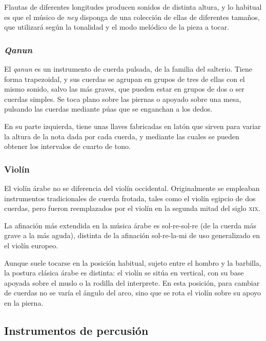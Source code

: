     Flautas de diferentes longitudes producen sonidos de distinta altura, y lo habitual es que el músico de \emph{ney} disponga de una colección de ellas de diferentes tamaños, que utilizará según la tonalidad  y el modo melódico de la pieza a tocar.


    \subsubsection{\emph{Qanun}}

    El \emph{qanun} es un instrumento de cuerda pulsada, de la familia del salterio. Tiene forma trapezoidal, y sus cuerdas se agrupan en grupos de tres de ellas con el mismo sonido, salvo las más graves, que pueden estar en grupos de dos o ser cuerdas simples. Se toca plano sobre las piernas o apoyado sobre una mesa, pulsando las cuerdas mediante púas que se enganchan a los dedos.

    En su parte izquierda, tiene unas llaves fabricadas en latón que sirven para variar la altura de la nota dada por cada cuerda, y mediante las cuales se pueden obtener los intervalos de cuarto de tono.


    \subsubsection{Violín}

    El violín árabe no se diferencia del violín occidental. Originalmente se empleaban instrumentos tradicionales de cuerda frotada, tales como el violín egipcio de dos cuerdas, pero fueron reemplazados por el violín en la segunda mitad del siglo \textsc{xix}.

    La afinación más extendida en la música árabe es sol-re-sol-re (de la cuerda más grave a la más aguda), distinta de la afinación sol-re-la-mi de uso generalizado en el violín europeo.

    Aunque suele tocarse en la posición habitual, sujeto entre el hombro y la barbilla, la postura clásica árabe es distinta: el violín se sitúa en vertical, con su base apoyada sobre el muslo o la rodilla del interprete. En esta posición, para cambiar de cuerdas no se varía el ángulo del arco, sino que se rota el violín sobre su apoyo en la pierna.


    \subsection{Instrumentos de percusión}

